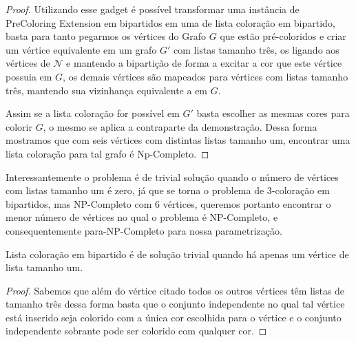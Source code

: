 \begin{proof}
Utilizando esse gadget é possível transformar uma instância de PreColoring Extension em bipartidos em uma de lista coloração em bipartido, basta para tanto pegarmos os vértices do Grafo $G$ que estão pré-coloridos e criar um vértice equivalente em um grafo $G'$ com listas tamanho três, os ligando aos vértices de $\mathcal{N}$ e mantendo a bipartição de forma a excitar a cor que este vértice possuia em $G$, os demais vértices são mapeados para vértices com listas tamanho três, mantendo sua vizinhança equivalente a em $G$.

Assim se a lista coloração for possível em $G'$ basta escolher as mesmas cores para colorir $G$, o mesmo se aplica a contraparte da demonstração. Dessa forma mostramos que com seis vértices com distintas listas tamanho um, encontrar uma lista coloração para tal grafo é Np-Completo. 

\end{proof}

Interessantemente o problema é de trivial solução quando o número de vértices com listas tamanho um é zero, já que se torna o problema de 3-coloração em bipartidos, mas NP-Completo com 6 vértices, queremos portanto encontrar o menor número de vértices no qual o problema é NP-Completo, e consequentemente para-NP-Completo para nossa parametrização.

\begin{teorema}
\label{lemma:1-col-P}
 Lista coloração em bipartido é de solução trivial quando há apenas um vértice de lista tamanho um.
\end{teorema}
\begin{proof}
 Sabemos que além do vértice citado todos os outros vértices têm listas de tamanho três dessa forma basta que o conjunto independente no qual tal vértice está inserido seja colorido com a única cor escolhida para o vértice e o conjunto independente sobrante pode ser colorido com qualquer cor.
\end{proof}

